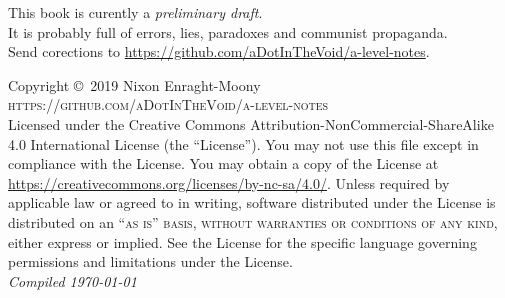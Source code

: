 
\newpage
\thispagestyle{plain}
\noindent This book is curently a \emph{preliminary draft}. \\

\noindent It is probably full of errors, lies, paradoxes and communist propaganda. \\

\noindent Send corections to \url{https://github.com/aDotInTheVoid/a-level-notes}.

\vfill

\noindent Copyright \copyright\ 2019 Nixon Enraght-Moony\\ %


\noindent \textsc{https://github.com/aDotInTheVoid/a-level-notes}\\ %

\noindent Licensed under the Creative Commons Attribution-NonCommercial-ShareAlike 4.0 International License (the ``License''). You may not use this file except in compliance with the License. You may obtain a copy of the License at \url{https://creativecommons.org/licenses/by-nc-sa/4.0/}. Unless required by applicable law or agreed to in writing, software distributed under the License is distributed on an \textsc{``as is'' basis, without warranties or conditions of any kind}, either express or implied. See the License for the specific language governing permissions and limitations under the License.\\ %

\noindent \textit{Compiled \today} %




\tableofcontents %

\cleardoublepage %
